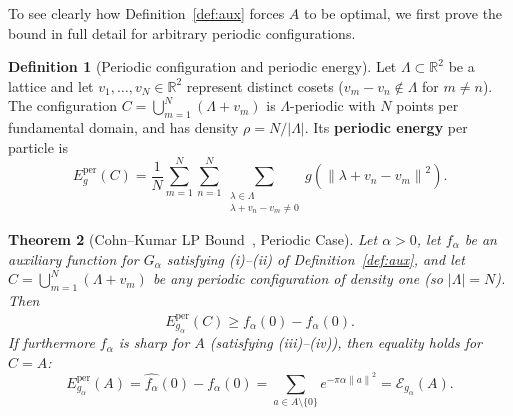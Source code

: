 \documentclass[11pt, a4paper]{article}
\newtheorem{theorem}{Theorem}[section]
\theoremstyle{definition}
\newtheorem{definition}[theorem]{Definition}
\theoremstyle{remark}
\newcommand{\R}{\mathbb{R}}
\newcommand{\Ecal}{\mathcal{E}}
\newcommand{\norm}[1]{\left\lVert #1 \right\rVert}
\newcommand{\abs}[1]{\left\lvert #1 \right\rvert}
\begin{document}
To see clearly how Definition~\ref{def:aux} forces $A$ to be optimal, we first prove the bound in full detail for arbitrary periodic configurations.

\begin{definition}[Periodic configuration and periodic energy]
Let $\Lambda \subset \R^2$ be a lattice and let $v_1, \dots, v_N \in \R^2$ represent distinct cosets ($v_m - v_n \notin \Lambda$ for $m \neq n$). The configuration $C = \bigcup_{m=1}^N (\Lambda + v_m)$ is $\Lambda$-periodic with $N$ points per fundamental domain, and has density $\rho = N / \abs{\Lambda}$. Its \textbf{periodic energy} per particle is
\[
E_g^{\text{per}}(C) = \frac{1}{N} \sum_{m=1}^N \sum_{n=1}^N \sum_{\substack{\lambda \in \Lambda \\ \lambda + v_n - v_m \neq 0}} g\left(\norm{\lambda + v_n - v_m}^2\right).
\]
\end{definition}

\begin{theorem}[Cohn--Kumar LP Bound~\cite{CK07}, Periodic Case]
\label{thm:lp_periodic}
Let $\alpha > 0$, let $f_\alpha$ be an auxiliary function for $G_\alpha$ satisfying (i)--(ii) of Definition~\ref{def:aux}, and let $C = \bigcup_{m=1}^N (\Lambda + v_m)$ be any periodic configuration of density one (so $\abs{\Lambda} = N$). Then
\begin{equation}
\label{eq:lp_bound}
E_{g_\alpha}^{\text{per}}(C) \ge \widehat{f_\alpha}(0) - f_\alpha(0).
\end{equation}
If furthermore $f_\alpha$ is sharp for $A$ (satisfying (iii)--(iv)), then equality holds for $C = A$:
\[
E_{g_\alpha}^{\text{per}}(A) = \widehat{f_\alpha}(0) - f_\alpha(0) = \sum_{a \in A \setminus \{0\}} e^{-\pi \alpha \norm{a}^2} = \Ecal_{g_\alpha}(A).
\]
\end{theorem}
\end{document}
